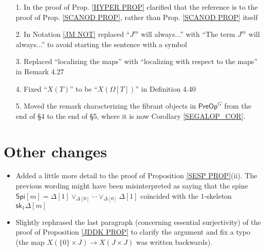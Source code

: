 \documentclass{article}
\begin{document}

\begin{itemize}
	\item[1.] In the proof of Prop. \ref{HYPER PROP} clarified that the reference is to the proof of Prop. \ref{SCANOD PROP}, rather than Prop. \ref{SCANOD PROP} itself
	\item[2.] In Notation \ref{JM NOT}
	replaced ``$J^m$ will always...'' with
	``The term $J^m$ will always...''
	to avoid starting the sentence with a symbol
	\item[3.] Replaced ``localizing the maps'' with ``localizing with respect to the maps'' in Remark 4.27
	\item[4.] Fixed ``$X(T)$'' to be ``$X(\Omega[T])$''
	in Definition 4.40
	\item[5.] Moved the remark characterizing the fibrant objects in
	$\mathsf{PreOp}^G$ from the end of \S 4 to the end of \S 5,
	where it is now Corollary \ref{SEGALOP_COR}.
\end{itemize}


\section{Other changes}


\begin{itemize}
	\item Added a little more detail to the proof of 
	Proposition \ref{SESP PROP}(ii).
	The previous wording might have been misinterpreted as saying that the spine $\mathsf{Spi}[m] = \Delta[1] \vee_{\Delta[0]} \cdots \vee_{\Delta[0]} \Delta[1]$
	coincided with the $1$-skeleton $\mathsf{sk}_1\Delta[m]$
	\item Slightly rephrased the last paragraph 
	(concerning essential surjectivity)
	of the proof of Proposition \ref{JDDK PROP}
	to clarify the argument
	and fix a typo
	(the map
	$X(\{0\} \times J) \to X (J \times J)$
	was written backwards). 
\end{itemize}



{}


\end{document}
